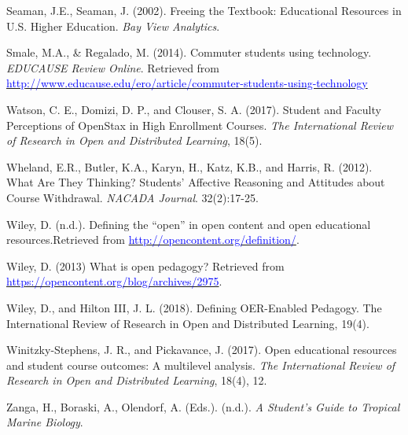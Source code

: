 \documentclass[11pt]{article}
\newcommand{\alink}[2]{\href{#1}{\textcolor{blue}{#2}}}
\begin{document}
\begin{thebibliography}{99}
   Seaman, J.E., Seaman, J. (2002). Freeing the Textbook: Educational Resources in U.S. Higher Education. {\em Bay View Analytics}. %

   Smale, M.A., \& Regalado, M. (2014). Commuter students using technology. {\em EDUCAUSE Review Online}. Retrieved from \alink{http://www.educause.edu/ero/article/commuter-students-using-technology}{http://www.educause.edu/ero/article/commuter-students-using-technology}  

   Watson, C. E., Domizi, D. P., and Clouser, S. A. (2017). Student and Faculty Perceptions of OpenStax in High Enrollment Courses. {\em The International Review of Research in Open and Distributed Learning}, 18(5). %

   Wheland, E.R., Butler, K.A., Karyn, H., Katz, K.B., and Harris, R. (2012). What Are They Thinking? Students' Affective Reasoning and Attitudes about Course Withdrawal. {\em NACADA Journal}. 32(2):17-25.

   Wiley, D. (n.d.). Defining the ``open'' in open content and open educational resources.\newline Retrieved from \alink{http://opencontent.org/definition/}{http://opencontent.org/definition/}.

   Wiley, D. (2013) What is open pedagogy? \newline Retrieved from \alink{https://opencontent.org/blog/archives/2975}{https://opencontent.org/blog/archives/2975}.

   Wiley, D., and Hilton III, J. L. (2018). Defining OER-Enabled Pedagogy. The International Review of Research in Open and Distributed Learning, 19(4).

   Winitzky-Stephens, J. R., and Pickavance, J. (2017). Open educational resources and student course outcomes: A multilevel analysis. {\em The International Review of Research in Open and Distributed Learning}, 18(4), 12.

   Zanga, H., Boraski, A., Olendorf, A. (Eds.). (n.d.). {\em A Student's Guide to Tropical Marine Biology}.

\end{thebibliography}
\end{document}
